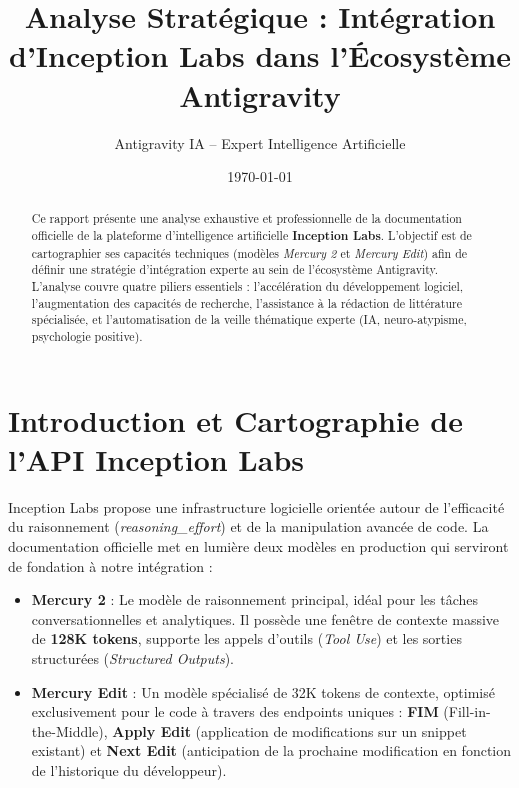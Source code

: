 \documentclass[12pt,a4paper]{article}
\title{\Huge \textbf{Analyse Stratégique : Intégration d'Inception Labs dans l'Écosystème Antigravity}}
\author{Antigravity IA -- Expert Intelligence Artificielle}
\date{\today}
\begin{document}
\maketitle
\thispagestyle{empty}

\begin{abstract}
Ce rapport présente une analyse exhaustive et professionnelle de la documentation officielle de la plateforme d'intelligence artificielle \textbf{Inception Labs}. L'objectif est de cartographier ses capacités techniques (modèles \textit{Mercury 2} et \textit{Mercury Edit}) afin de définir une stratégie d'intégration experte au sein de l'écosystème Antigravity. L'analyse couvre quatre piliers essentiels : l'accélération du développement logiciel, l'augmentation des capacités de recherche, l'assistance à la rédaction de littérature spécialisée, et l'automatisation de la veille thématique experte (IA, neuro-atypisme, psychologie positive).
\end{abstract}

\vfill
\tableofcontents
\newpage

\section{Introduction et Cartographie de l'API Inception Labs}

Inception Labs propose une infrastructure logicielle orientée autour de l'efficacité du raisonnement (\textit{reasoning\_effort}) et de la manipulation avancée de code. La documentation officielle met en lumière deux modèles en production qui serviront de fondation à notre intégration :

\begin{itemize}
    \item \textbf{Mercury 2} : Le modèle de raisonnement principal, idéal pour les tâches conversationnelles et analytiques. Il possède une fenêtre de contexte massive de \textbf{128K tokens}, supporte les appels d'outils (\textit{Tool Use}) et les sorties structurées (\textit{Structured Outputs}).
    \item \textbf{Mercury Edit} : Un modèle spécialisé de 32K tokens de contexte, optimisé exclusivement pour le code à travers des endpoints uniques : \textbf{FIM} (Fill-in-the-Middle), \textbf{Apply Edit} (application de modifications sur un snippet existant) et \textbf{Next Edit} (anticipation de la prochaine modification en fonction de l'historique du développeur).
\end{itemize}
\end{document}
